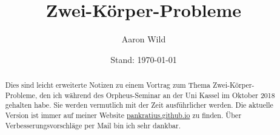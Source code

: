 	\date[]{Stand: \today}
	\title{Zwei-Körper-Probleme}
	\author{Aaron Wild}
	\begin{abstract}
		Dies sind leicht erweiterte Notizen zu einem Vortrag zum Thema Zwei-Körper-Probleme, den ich während des Orpheus-Seminar an der Uni Kassel im Oktober 2018 gehalten habe. Sie werden vermutlich mit der Zeit ausführlicher werden. Die aktuelle Version ist immer auf meiner Website \url{pankratius.github.io} zu finden. Über Verbesserungsvorschläge per Mail bin ich sehr dankbar.
	\end{abstract}
	\maketitle




	\tableofcontents
	\makeatletter
